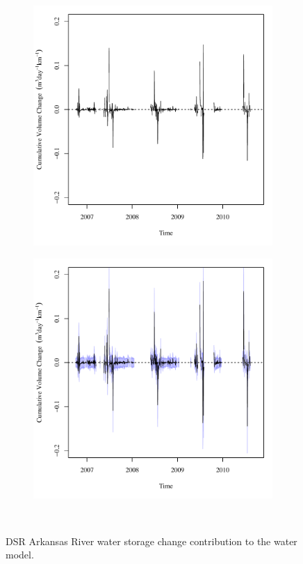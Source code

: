 \begin{linenumbers}
\begin{figure}[htbp]
	\centering
	\begin{subfigure}{0.5\textwidth}
		\centering
		\includegraphics[width=0.9\linewidth]{"Figures/Results_DSR/Deterministic/Balance Water - storage"}
	\end{subfigure}%
	\begin{subfigure}{0.5\textwidth}
		\centering
		\includegraphics[width=0.9\linewidth]{"Figures/Results_DSR/Stochastic/Balance Water - storage"}
	\end{subfigure}\\
	\caption[DSR Arkansas River water storage change contribution to the water model.]{DSR Arkansas River water storage change contribution to the water model.}
	\label{fig:DSRWaterStore}
\end{figure}


\end{linenumbers}
